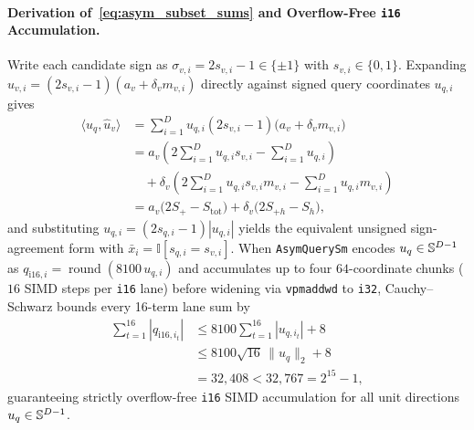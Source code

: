 \paragraph{Derivation of~\eqref{eq:asym_subset_sums} and Overflow-Free \texttt{i16} Accumulation.}
Write each candidate sign as $\sigma_{v,i} = 2 s_{v,i} - 1 \in \{\pm 1\}$ with $s_{v,i} \in \{0, 1\}$.
Expanding $\hat{u}_{v,i} = (2 s_{v,i} - 1)(a_v + \delta_v m_{v,i})$ directly against signed query coordinates $u_{q,i}$ gives
\begin{align}
  \langle u_q, \hat{u}_v\rangle
  &= \sum_{i=1}^D u_{q,i}(2 s_{v,i} - 1)\bigl(a_v + \delta_v m_{v,i}\bigr) \nonumber \\
  &= a_v\!\left(2\sum_{i=1}^D u_{q,i} s_{v,i} - \sum_{i=1}^D u_{q,i}\right) \nonumber \\
  &\quad+ \delta_v\!\left(2\sum_{i=1}^D u_{q,i} s_{v,i} m_{v,i} - \sum_{i=1}^D u_{q,i} m_{v,i}\right) \nonumber \\
  &= a_v\bigl(2 S_+ - S_{\mathrm{tot}}\bigr) + \delta_v\bigl(2 S_{+h} - S_h\bigr),
\end{align}
and substituting $u_{q,i} = (2 s_{q,i} - 1)|u_{q,i}|$ yields the equivalent unsigned sign-agreement form with $\bar{x}_i = \mathbb{I}[s_{q,i} = s_{v,i}]$.
When \texttt{AsymQuerySm} encodes $u_q \in \mathbb{S}^{D-1}$ as $q_{\mathrm{i16},i} = \operatorname{round}(8100\,u_{q,i})$ and accumulates up to four $64$-coordinate chunks ($16$ SIMD steps per \texttt{i16} lane) before widening via \texttt{vpmaddwd} to \texttt{i32}, Cauchy--Schwarz bounds every 16-term lane sum by
\[
  \begin{aligned}
    \sum_{t=1}^{16} |q_{\mathrm{i16},i_t}|
    &\le 8100\sum_{t=1}^{16} |u_{q,i_t}| + 8 \\
    &\le 8100\sqrt{16}\,\|u_q\|_2 + 8 \\
    &= 32{,}408 < 32{,}767 = 2^{15} - 1,
  \end{aligned}
\]
guaranteeing strictly overflow-free \texttt{i16} SIMD accumulation for all unit directions $u_q \in \mathbb{S}^{D-1}$.


